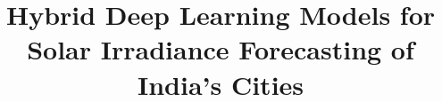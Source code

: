 \documentclass[a4paper,fleqn]{cas-sc}
\begin{document}
\let\WriteBookmarks\relax
\def\floatpagepagefraction{1}
\def\textpagefraction{.001}



\title [mode = title]{Hybrid Deep Learning Models for Solar Irradiance Forecasting of India's Cities}

\end{document}
